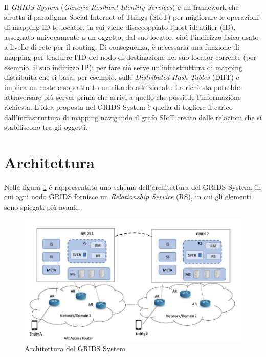 Il \textit{GRIDS System} (\textit{Generic Resilient Identity Services}) è un framework che sfrutta il paradigma Social Internet of Things (SIoT) per migliorare le operazioni di mapping ID-to-locator\cite{7983351}, in cui viene disaccoppiato l'host identifier (ID), assegnato univocamente a un oggetto, dal suo locator, cioè l'indirizzo fisico usato a livello di rete per il routing. Di conseguenza, è necessaria una funzione di mapping per tradurre l'ID del nodo di destinazione nel suo locator corrente (per esempio, il suo indirizzo IP): per fare ciò serve un'infrastruttura di mapping distribuita che si basa, per esempio, sulle \textit{Distributed Hash Tables} (DHT) e implica un costo e soprattutto un ritardo addizionale. La richiesta potrebbe attraversare più server prima che arrivi a quello che possiede l'informazione richiesta. L'idea proposta nel GRIDS System è quella di togliere il carico dall'infrastruttura di mapping navigando il grafo SIoT creato dalle relazioni che si stabiliscono tra gli oggetti.

\section{Architettura}
\label{c:grids:arch}

Nella figura \ref{f:grids:arch} è rappresentato uno schema dell'architettura del GRIDS System, in cui ogni nodo GRIDS fornisce un \textit{Relationship Service} (RS), in cui gli elementi sono spiegati più avanti.

\begin{figure}[h!t]
\centerline{\includegraphics[scale=0.5]{img/GRIDSarch}}
\caption{Architettura del GRIDS System}
\label{f:grids:arch}
\end{figure}

